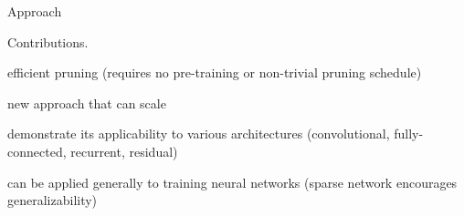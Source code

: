 {Approach
\begin{tight_itemize}
\item
\end{tight_itemize}

Contributions.
\begin{tight_itemize}
\item efficient pruning (\eg requires no pre-training or non-trivial pruning schedule)
\item new approach that can scale
\item demonstrate its applicability to various architectures (convolutional, fully-connected, recurrent, residual)
\item can be applied generally to training neural networks (sparse network encourages generalizability)
\end{tight_itemize}
}
